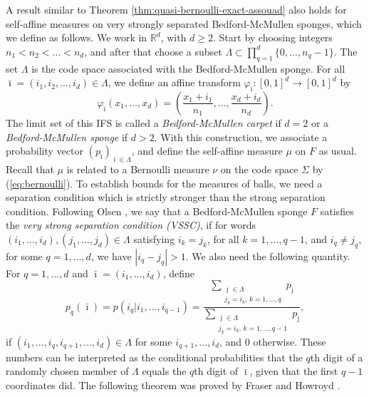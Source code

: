 \documentclass{PRM}
\newcommand{\field}[1]{\mathbb{#1}}
\newcommand{\R}{\field{R}}
\theoremstyle{plain}
\theoremstyle{definition}
\theoremstyle{remark}
\begin{document}
A result similar to Theorem \ref{thm:quasi-bernoulli-exact-assouad} also holds for self-affine measures on very strongly separated Bedford-McMullen sponges, which we define as follows. We work in $\R^d$, with $d\geq 2$. Start by choosing integers $n_1<n_2<\ldots<n_d$, and after that choose a subset $\Lambda\subset \prod_{q=1}^d\{0,\ldots,n_q - 1\}$. The set $\Lambda$ is the code space associated with the Bedford-McMullen sponge. For all $\bar{\imath}=(i_1,i_2,\ldots,i_d)\in\Lambda$, we define an affine transform $\varphi_{\bar{\imath}}:[0,1]^d\to[0,1]^d$ by
\begin{equation*}
    \varphi_{\bar{\imath}}(x_1,\ldots,x_d)=\left(\frac{x_1+i_1}{n_1},\ldots,\frac{x_d+i_d}{n_d}\right).
\end{equation*}
The limit set of this IFS is called a \emph{Bedford-McMullen carpet} if $d=2$ or a \emph{Bedford-McMullen sponge} if $d>2$. With this construction, we associate a probability vector $(p_{\bar{\imath}})_{\bar{\imath}\in\Lambda}$, and define the self-affine measure $\mu$ on $F$ as usual. Recall that $\mu$ is related to a Bernoulli measure $\nu$ on the code space $\Sigma$ by (\ref{eq:bernoulli}). To establish bounds for the measures of balls, we need a separation condition which is strictly stronger than the strong separation condition. Following Olsen \cite{O}, we say that a Bedford-McMullen sponge $F$ satisfies the \emph{very strong separation condition (VSSC)}, if for words $(i_1,\ldots,i_d),(j_1,\ldots,j_d)\in\Lambda$ satisfying $i_k=j_k$, for all $k=1,\ldots, q-1$, and $i_q\ne j_q$, for some $q=1,\ldots,d$, we have $|i_q-j_q|>1$.
We also need the following quantity. For $q=1,\ldots,d$ and $\bar{\imath}=(i_1,\ldots,i_d)$, define
\begin{equation}\label{eq:cond_prob}
    p_q(\bar{\imath})=p(i_q|i_1,\ldots,i_{q-1})=\dfrac{\sum\limits_{\substack{\bar{\jmath}\in \Lambda\\ j_k=i_k,\,k=1,\ldots,q}}p_{\bar{\jmath}}}{\sum\limits_{\substack{\bar{\jmath}\in \Lambda\\ j_k=i_k,\,k=1,\ldots,q-1}}p_{\bar{\jmath}}},
\end{equation}
if $(i_1,\ldots,i_q,i_{q+1},\ldots,i_d)\in\Lambda$ for some $i_{q+1},\ldots,i_d$, and 0 otherwise. These numbers can be interpreted as the conditional probabilities that the $q$th digit of a randomly chosen member of $\Lambda$ equals the $q$th digit of $\bar{\imath}$, given that the first $q-1$ coordinates did. The following theorem was proved by Fraser and Howroyd \cite[Theorem 2.6]{FH}.
\end{document}
